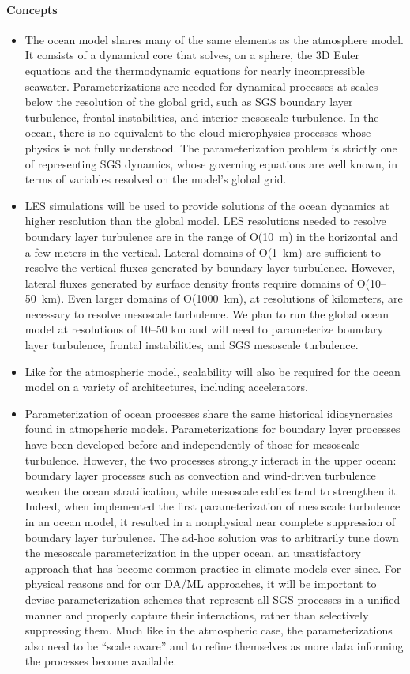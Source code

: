 \documentclass{article}
\begin{document}
\paragraph{Concepts}
\begin{itemize}
    \item The ocean model shares many of the same elements as the atmosphere model. It consists of a dynamical core that solves, on a sphere, the 3D Euler equations and the thermodynamic equations for nearly incompressible seawater. Parameterizations are needed for dynamical processes at scales below the resolution of the global grid, such as SGS boundary layer turbulence, frontal instabilities, and interior mesoscale turbulence. In the ocean, there is no equivalent to the cloud microphysics processes whose physics is not fully understood. The parameterization problem is strictly one of representing SGS dynamics, whose governing equations are well known, in terms of variables resolved on the model's global grid.
    \item LES simulations will be used to provide solutions of the ocean dynamics at higher resolution than the global model. LES resolutions needed to resolve boundary layer turbulence are in the range of O(10~m) in the horizontal and a few meters in the vertical. Lateral domains of O(1~km) are sufficient to resolve the vertical fluxes generated by boundary layer turbulence. However, lateral fluxes generated by surface density fronts require domains of O(10--50~km). Even larger domains of O(1000~km), at resolutions of kilometers, are necessary to resolve mesoscale turbulence. We plan to run the global ocean model at resolutions of 10--50 km and will need to parameterize boundary layer turbulence, frontal instabilities, and SGS mesoscale turbulence.
    \item Like for the atmospheric model, scalability will also be required for the ocean model on a variety of architectures, including accelerators. 
    \item Parameterization of ocean processes share the same historical idiosyncrasies found in atmopsheric models. Parameterizations for boundary layer processes have been developed before and independently of those for mesoscale turbulence. However, the two processes strongly interact in the upper ocean: boundary layer processes such as convection and wind-driven turbulence weaken the ocean stratification, while mesoscale eddies tend to strengthen it. Indeed, when \citet{Gent90} implemented the first parameterization of mesoscale turbulence in an ocean model, it resulted in a nonphysical near complete suppression of boundary layer turbulence. The ad-hoc solution was to arbitrarily tune down the mesoscale parameterization in the upper ocean, an unsatisfactory approach that has become common practice in climate models ever since. For  physical reasons and for our DA/ML approaches, it will be important to devise parameterization schemes that represent all SGS processes in a unified manner and properly capture their interactions, rather than selectively suppressing them. Much like in the atmospheric case, the parameterizations also need to be ``scale aware'' and to refine themselves as more data informing the processes become available. 

\end{itemize}
\end{document}
